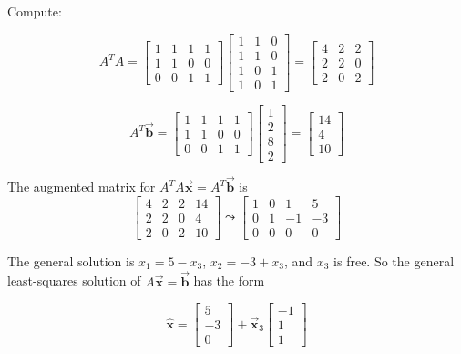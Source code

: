 \documentclass[letter,11pt]{article}
\theoremstyle{definition}
\begin{document}
\begin{tcolorbox}[boxrule=1mm,enhanced jigsaw, breakable,before=\hfill,after=\hfill,adjusted title={Problem 7 solutions}]
Compute:

$$A^{T}A = \begin{bmatrix} 1 & 1 & 1 & 1\\ 1 & 1 & 0 & 0\\ 0 & 0 & 1 & 1 \end{bmatrix}\begin{bmatrix} 1 & 1 & 0 \\ 1 & 1 & 0 \\ 1 & 0 & 1 \\ 1 & 0 & 1 \end{bmatrix} = \begin{bmatrix} 4 & 2 & 2\\ 2 & 2 & 0\\ 2 & 0 & 2 \end{bmatrix}$$

$$A^{T}\vec{\boldsymbol{b}} = \begin{bmatrix} 1 & 1 & 1 & 1\\ 1 & 1 & 0 & 0\\ 0 & 0 & 1 & 1 \end{bmatrix}\begin{bmatrix} 1 \\ 2 \\ 8 \\2 \end{bmatrix} = \begin{bmatrix} 14 \\ 4 \\ 10 \end{bmatrix}$$

The augmented matrix for $A^{T}A\vec{\boldsymbol{x}}=A^{T} \vec{\boldsymbol{b}}$ is
    $$\begin{bmatrix}
        4 & 2 & 2 & 14\\
        2 & 2 & 0 & 4 \\
        2 & 0 & 2 & 10
    \end{bmatrix} \leadsto 
    \begin{bmatrix}
        1 & 0 & 1 & 5\\
        0 & 1 & -1 & -3 \\
        0 & 0 & 0 & 0
    \end{bmatrix}$$

The general solution is $x_{1} = 5 - x_{3}$, $x_{2} = -3 + x_{3}$, and $x_3$ is free. So the general least-squares solution of $A\vec{\boldsymbol{x}} = \vec{\boldsymbol{b}}$ has the form

$$\hat{\boldsymbol{x}} = \begin{bmatrix}5 \\ -3 \\ 0\end{bmatrix} + \vec{\boldsymbol{x}}_{3}\begin{bmatrix}-1 \\ 1 \\ 1\end{bmatrix}$$

\end{tcolorbox}
\end{document}
